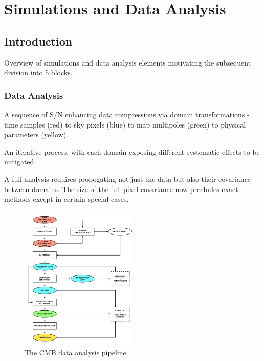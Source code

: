  
\chapter{Simulations and Data Analysis}
\renewcommand*\thesection{\arabic{section}}


\section{Introduction}

Overview of simulations and data analysis elements motivating the subsequent division into 5 blocks.

\subsection{Data Analysis}

A sequence of S/N enhancing data compressions via domain transformations - time samples (red) to sky pixels (blue) to map multipoles (green) to physical parameters (yellow).

An iterative process, with each domain exposing different systematic effects to be mitigated.

A full analysis requires propogating not just the data but also their covariance between domains. The size of the full pixel covariance now precludes exact methods except in certain special cases.

\begin{figure}[htbp]
\hspace*{3in}\includegraphics[width=0.5\textwidth]{Analysis/da}
\caption{The CMB data analysis pipeline}
\label{default}

\end{figure}

